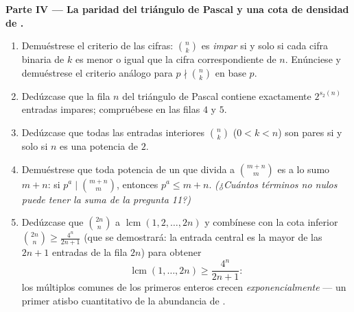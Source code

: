 \begin{problem}
\medskip
\noindent\textbf{Parte IV --- La paridad del triángulo de Pascal y una
cota de densidad de .}
\begin{enumerate}[resume]
  \item Demuéstrese el criterio de las cifras: $\binom nk$ es
        \emph{impar} si y solo si cada cifra binaria de $k$ es menor o
        igual que la cifra correspondiente de $n$. Enúnciese y
        demuéstrese el criterio análogo para $p \nmid \binom nk$ en
        base $p$.
  \item Dedúzcase que la fila $n$ del triángulo de Pascal contiene
        exactamente $2^{s_2(n)}$ entradas impares; compruébese en las
        filas $4$ y $5$.
  \item Dedúzcase que todas las entradas interiores $\binom nk$
        ($0 < k < n$) son pares si y solo si $n$ es una potencia
        de $2$.
  \item Demuéstrese que toda potencia de un  que divida a
        $\binom{m+n}m$ es a lo sumo $m + n$: si $p^a \mid \binom{m+n}m$,
        entonces $p^a \leq m + n$. \emph{(¿Cuántos términos no nulos
        puede tener la suma de la pregunta 11?)}
  \item Dedúzcase que $\binom{2n}n$  a
        $\operatorname{lcm}(1, 2, \dots, 2n)$ y combínese con la cota
        inferior $\binom{2n}n \geq \frac{4^n}{2n+1}$ (que se
        demostrará: la entrada central es la mayor de las $2n + 1$
        entradas de la fila $2n$) para obtener
        \[
        \operatorname{lcm}(1, \dots, 2n) \geq \frac{4^n}{2n+1} :
        \]
        los múltiplos comunes de los primeros enteros crecen
        \emph{exponencialmente} --- un primer atisbo cuantitativo de
        la abundancia de .
\end{enumerate}


\end{problem}
